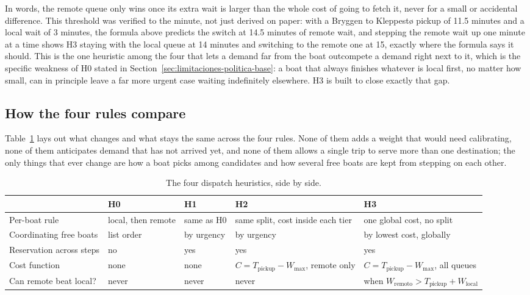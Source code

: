 \documentclass[11pt,a4paper]{article}
\begin{document}
In words, the remote queue only wins once its extra wait is larger than the whole cost of going to fetch it, never for a small or accidental difference. This threshold was verified to the minute, not just derived on paper: with a Bryggen to Kleppestø pickup of 11.5 minutes and a local wait of 3 minutes, the formula above predicts the switch at 14.5 minutes of remote wait, and stepping the remote wait up one minute at a time shows H3 staying with the local queue at 14 minutes and switching to the remote one at 15, exactly where the formula says it should. This is the one heuristic among the four that lets a demand far from the boat outcompete a demand right next to it, which is the specific weakness of H0 stated in Section~\ref{sec:limitaciones-politica-base}: a boat that always finishes whatever is local first, no matter how small, can in principle leave a far more urgent case waiting indefinitely elsewhere. H3 is built to close exactly that gap.

\subsection{How the four rules compare}
\label{sec:comparacion-heuristicas}

Table~\ref{tab:comparacion-heuristicas-reglas} lays out what changes and what stays the same across the four rules. None of them adds a weight that would need calibrating, none of them anticipates demand that has not arrived yet, and none of them allows a single trip to serve more than one destination; the only things that ever change are how a boat picks among candidates and how several free boats are kept from stepping on each other.

\begin{table}[H]
\centering
\caption{The four dispatch heuristics, side by side.}
\label{tab:comparacion-heuristicas-reglas}
\scriptsize
\begin{tabular}{p{2.7cm}p{2.3cm}p{2.3cm}p{2.9cm}p{3.1cm}}
\toprule
 & H0 & H1 & H2 & H3 \\
\midrule
Per-boat rule & local, then remote & same as H0 & same split, cost inside each tier & one global cost, no split \\
Coordinating free boats & list order & by urgency & by urgency & by lowest cost, globally \\
Reservation across steps & no & yes & yes & yes \\
Cost function & none & none & $C=T_{\text{pickup}}-W_{\max}$, remote only & $C=T_{\text{pickup}}-W_{\max}$, all queues \\
Can remote beat local? & never & never & never & when $W_{\text{remoto}} > T_{\text{pickup}}+W_{\text{local}}$ \\
\bottomrule
\end{tabular}
\end{table}
\end{document}
